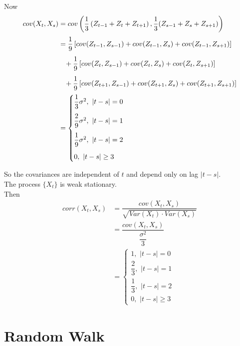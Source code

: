 \documentclass[11pt, a4paper]{article}
\numberwithin{equation}{section}
\theoremstyle{definition}
\begin{document}
Now
\begin{align*}
cov(X_t, X_s) &= cov\left(\dfrac{1}{3}\left(Z_{t-1} + Z_t + Z_{t+1}\right), \dfrac{1}{3}(Z_{s-1} + Z_s + Z_{s+1})\right) \\[0.25em]
&= \dfrac{1}{9} \left[ cov(Z_{t-1}, Z_{s-1}) + cov(Z_{t-1}, Z_{s}) + cov(Z_{t-1}, Z_{s+1}) \right] \\[0.45em]
&\hspace{0.3cm} + \dfrac{1}{9} \left[ cov(Z_{t}, Z_{s-1}) + cov(Z_{t}, Z_{s}) + cov(Z_{t}, Z_{s+1}) \right] \\[0.45em]
&\hspace{0.3cm} + \dfrac{1}{9} \left[ cov(Z_{t+1}, Z_{s-1}) + cov(Z_{t+1}, Z_{s}) + cov(Z_{t+1}, Z_{s+1}) \right] \\[0.25em]
&= \begin{cases}
\dfrac{1}{3} \sigma^2, \,\, |t-s| = 0 \\[1em]
\dfrac{2}{9} \sigma^2, \,\, |t-s| = 1 \\[1em]
\dfrac{1}{9} \sigma^2, \,\, |t-s| = 2 \\[1em]
0, \,\, |t-s| \geq 3
\end{cases}
\end{align*}

\therefore \hspace{0.1cm} So the covariances are independent of $t$ and depend only on lag $|t-s|$. \\

\Rightarrow \hspace{0.1cm} The process $\{X_t\}$ is weak stationary. \\

Then
\begin{align*}
corr(X_t, X_s) &= \dfrac{cov(X_t, X_s)}{\sqrt{Var(X_t) \cdot Var(X_s)}} \\[0.25em]
&= \dfrac{cov(X_t, X_s)}{\dfrac{\sigma^2}{3}} \\[0.25em]
&= \begin{cases}
1, \,\, |t-s| = 0 \\[1em]
\dfrac{2}{3}, \,\, |t-s| = 1 \\[1em]
\dfrac{1}{3}, \,\, |t-s| = 2 \\[1em]
0, \,\, |t-s| \geq 3
\end{cases}
\end{align*}

\newpage
\section{Random Walk}
\end{document}
